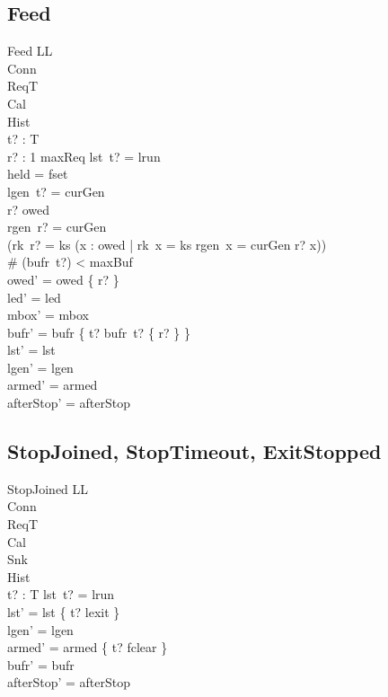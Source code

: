 \documentclass[a4paper,10pt,fleqn]{article}
\begin{document}
\subsection{Feed}

\begin{schema}{Feed}
  \Delta LL \\
  \Xi Conn \\
  \Xi ReqT \\
  \Xi Cal \\
  \Xi Hist \\
  t? : T \\
  r? : 1 \upto maxReq
\where
  lst~t? = lrun \\
  held = fset \\
  lgen~t? = curGen \\
  r? \in owed \\
  rgen~r? = curGen \\
  (rk~r? = ks \implies
    (\forall x : owed | rk~x = ks \land rgen~x = curGen \spot r? \leq x)) \\
  \# (bufr~t?) < maxBuf \\
  owed' = owed \setminus \{ r? \} \\
  led' = led \\
  mbox' = mbox \\
  bufr' = bufr \oplus \{ t? \mapsto bufr~t? \cup \{ r? \} \} \\
  lst' = lst \\
  lgen' = lgen \\
  armed' = armed \\
  afterStop' = afterStop
\end{schema}

\subsection{StopJoined, StopTimeout, ExitStopped}



\begin{schema}{StopJoined}
  \Delta LL \\
  \Xi Conn \\
  \Xi ReqT \\
  \Xi Cal \\
  \Xi Snk \\
  \Xi Hist \\
  t? : T
\where
  lst~t? = lrun \\
  lst' = lst \oplus \{ t? \mapsto lexit \} \\
  lgen' = lgen \\
  armed' = armed \oplus \{ t? \mapsto fclear \} \\
  bufr' = bufr \\
  afterStop' = afterStop
\end{schema}
\end{document}
